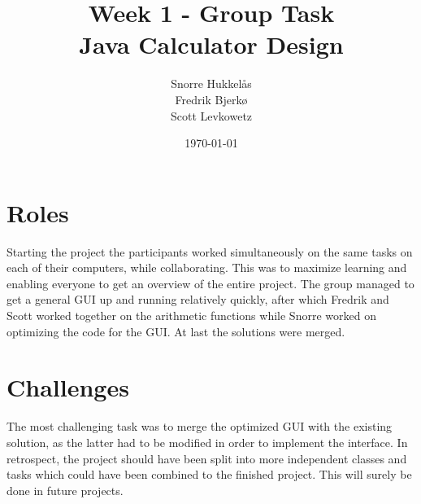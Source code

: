 \documentclass{article}
\title{Week 1 - Group Task\\\textbf{Java Calculator Design}} %
\author{Snorre Hukkel\aa s\\Fredrik Bjerk\o \\ Scott Levkowetz} %
\date{\today} %
\begin{document}
\maketitle %



\section{Roles}
Starting the project the participants worked simultaneously on the same tasks on each of their computers, while collaborating. This was to maximize learning and enabling everyone to get an overview of the entire project. The group managed to get a general GUI up and running relatively quickly, after which Fredrik and Scott worked together on the arithmetic functions while Snorre worked on optimizing the code for the GUI. At last the solutions were merged.

\section{Challenges}
The most challenging task was to merge the optimized GUI with the existing solution, as the latter had to be modified in order to implement the interface. In retrospect, the project should have been split into more independent classes and tasks which could have been combined to the finished project. This will surely be done in future projects. 


%
%
%

\end{document}
